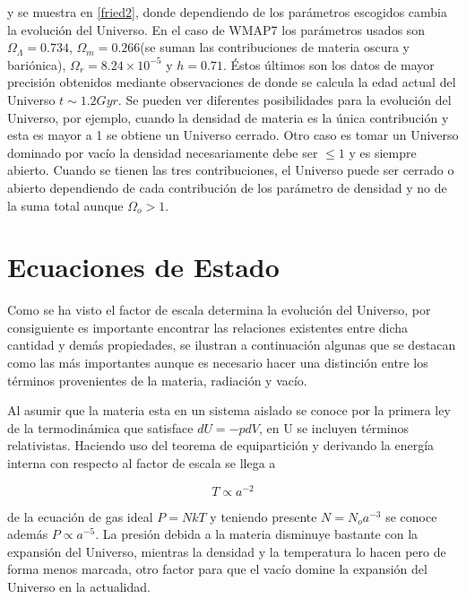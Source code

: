 y se muestra en \ref{fried2}, donde
dependiendo de los parámetros escogidos cambia la evolución del Universo. En el caso
de WMAP7 los parámetros usados son $\Omega_\Lambda = 0.734$, $\Omega_m = 0.266$(se suman
las contribuciones de materia oscura y bariónica), $\Omega_r = 8.24\times10^{-5}$ y 
$h=0.71$. Éstos últimos son los datos de mayor precisión obtenidos mediante
observaciones de donde se calcula la edad actual del Universo $t\sim 1.2Gyr$. 
Se pueden ver diferentes posibilidades para la evolución
del Universo, por ejemplo, cuando la densidad de materia es la única contribución
y esta es mayor a 1 se obtiene un Universo cerrado. Otro caso es tomar un Universo 
dominado por vacío la densidad necesariamente debe ser $\leq 1$ y es siempre abierto. 
Cuando se tienen las tres contribuciones, el Universo puede ser cerrado o abierto 
dependiendo de cada contribución de los parámetro de densidad y no de la suma total 
aunque $\Omega_o>1$.
	
\section{Ecuaciones de Estado}

Como se ha visto el factor de escala determina la evolución del Universo, 
por consiguiente es importante encontrar las relaciones existentes entre 
dicha cantidad y demás propiedades, se ilustran a continuación algunas 
que se destacan como las más importantes aunque es necesario hacer 
una distinción entre los términos provenientes de la materia, radiación 
y vacío. 

Al asumir que la materia esta en un sistema aislado se conoce
por la primera ley de la termodinámica que satisface $dU = -pdV$, 
en U se incluyen términos relativistas. Haciendo uso del teorema
de equipartición y derivando la energía interna con respecto al factor 
de escala se llega a

\[ T \propto a^{-2} \]

de la ecuación de gas ideal $P = NkT$ y teniendo presente $N = N_oa^{-3}$ 
se conoce además  $P \propto a^{-5}$. La presión debida a la materia
disminuye bastante con la expansión del Universo, mientras 	la densidad 
y la temperatura lo hacen pero de forma menos marcada, otro factor 
para que el vacío domine la expansión del Universo en la actualidad.   


